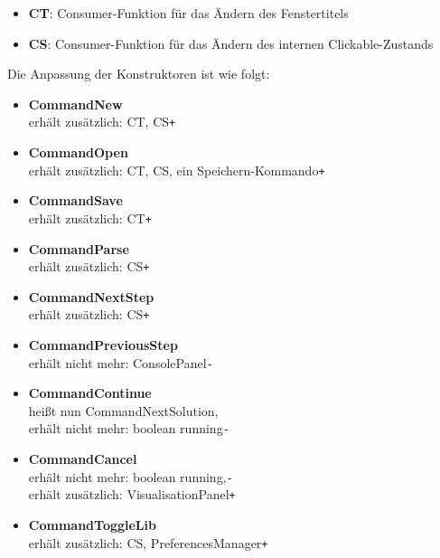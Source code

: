 \documentclass[parskip=full,11pt,twoside]{scrartcl}
\begin{document}
\begin{itemize}
	\item \textbf{CT}: Consumer-Funktion für das Ändern des Fenstertitels
	\item \textbf{CS}: Consumer-Funktion für das Ändern des internen Clickable-Zustands
\end{itemize}

Die Anpassung der Konstruktoren ist wie folgt:
\begin{itemize}
	\item \textbf{CommandNew}\\\hspace*{1cm}erhält zusätzlich: CT, CS\hfill \texttt{+}
	\item \textbf{CommandOpen}\\\hspace*{1cm}erhält zusätzlich: CT, CS, ein Speichern-Kommando\hfill\texttt{+}
	\item \textbf{CommandSave}\\\hspace*{1cm}erhält zusätzlich: CT\hfill\texttt{+}
	\item \textbf{CommandParse}\\\hspace*{1cm}erhält zusätzlich: CS\hfill\texttt{+}
	\item \textbf{CommandNextStep}\\\hspace*{1cm}erhält zusätzlich: CS\hfill\texttt{+}
	\item \textbf{CommandPreviousStep}\\\hspace*{1cm}erhält nicht mehr: ConsolePanel\hfill\texttt{-}
	\item \textbf{CommandContinue}\\\hspace*{1cm}heißt nun CommandNextSolution,
								  \\\hspace*{1cm}erhält nicht mehr: boolean running\hfill\texttt{-}
	\item \textbf{CommandCancel}\\\hspace*{1cm}erhält nicht mehr: boolean running,\hfill\texttt{-}
								\\\hspace*{1cm}erhält zusätzlich: VisualisationPanel\hfill\texttt{+}
	\item \textbf{CommandToggleLib}\\\hspace*{1cm}erhält zusätzlich: CS, PreferencesManager\hfill\texttt{+}

\end{itemize}
\end{document}
